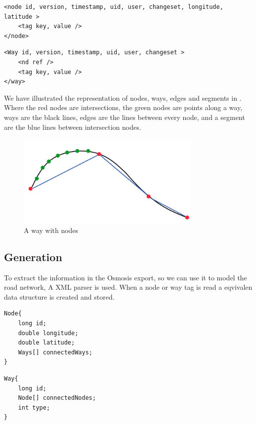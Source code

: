 \begin{lstlisting}[style=XML, caption=Node representation]
<node id, version, timestamp, uid, user, changeset, longitude, latitude >
	<tag key, value />
</node>
\end{lstlisting}

\begin{lstlisting}[style=XML, caption=Way representation]
<Way id, version, timestamp, uid, user, changeset >
	<nd ref />
	<tag key, value />
</way>
\end{lstlisting}

We have illustrated the representation of nodes, ways, edges and segments in . Where the red nodes are intersections, the green nodes are points along a way, ways are the black lines, edges are the lines between every node, and a segment are the blue lines between intersection nodes.

\begin{figure}[h!]
  \centering
    \includegraphics[width=0.8\textwidth]{figures/way-w-nodes.png}
    \caption{A way with nodes}
    \label{fig:waywithnodes}
\end{figure}

\subsection{Generation}
To extract the information in the Osmosis export, so we can use it to model the road network, A XML parser is used. When a node or way tag is read a eqvivalen data structure is created and stored. 
\begin{lstlisting}[style=java, caption=Datastructure for a node]
Node{
	long id;
	double longitude;
	double latitude;
	Ways[] connectedWays;
}
\end{lstlisting}

\begin{lstlisting}[style=java, caption=Datastructure for a way]
Way{
	long id;
	Node[] connectedNodes;
	int type;
}
\end{lstlisting}

